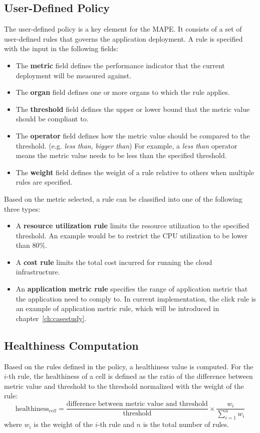 \documentclass{seal_thesis}
\begin{document}
\subsection{User-Defined Policy}
The user-defined policy is a key element for the MAPE.
It consists of a set of user-defined rules that governs the application deployment.
A rule is specified with the input in the following fields:
\begin{itemize}
\item The \textbf{metric} field defines the performance indicator that the current deployment will be measured against.
\item The \textbf{organ} field defines one or more organs to which the rule applies.
\item The \textbf{threshold} field defines the upper or lower bound that the metric value should be compliant to.
\item The \textbf{operator} field defines how the metric value should be compared to the threshold. (e.g. \textit{less than}, \textit{bigger than})
For example, a \textit{less than} operator means the metric value needs to be less than the specified threshold.
\item The \textbf{weight} field defines the weight of a rule relative to others when multiple rules are specified.
\end{itemize}
Based on the metric selected, a rule can be classified into one of the following three types:
\begin{itemize}
\item A \textbf{resource utilization rule} limits the resource utilization to the specified threshold.
An example would be to restrict the CPU utilization to be lower than 80\%.
\item A \textbf{cost rule} limits the total cost incurred for running the cloud infrastructure.
\item An \textbf{application metric rule} specifies the range of application metric that the application need to comply to.
In current implementation, the click rule is an example of application metric rule, which will be introduced in chapter~\ref{ch:casestudy}.
\end{itemize}

\subsection{Healthiness Computation}
Based on the rules defined in the policy, a healthiness value is computed.
For the $i$-th rule, the healthiness of a cell is defined as the ratio of the difference between metric value and threshold to the threshold normalized with the weight of the rule:
\[ \textrm{healthiness}_{cell} = \frac{\textrm{difference between metric value and threshold}}{\textrm{threshold}} \times \frac{w_i}{\sum_{i=1}^{n}{w_i}}\]
where $w_i$ is the weight of the $i$-th rule and $n$ is the total number of rules.
\end{document}
